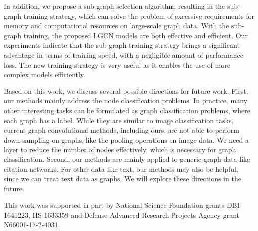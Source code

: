 \documentclass[sigconf]{acmart}
\begin{document}
In addition, we propose a sub-graph selection algorithm, resulting
in the sub-graph training strategy, which can solve the problem of
excessive requirements for memory and computational resources on
large-scale graph data. With the sub-graph training, the proposed
LGCN models are both effective and efficient. Our experiments
indicate that the sub-graph training strategy brings a significant
advantage in terms of training speed, with a negligible amount of
performance loss. The new training strategy is very useful as it
enables the use of more complex models efficiently.


Based on this work, we discuss several possible directions for
future work. First, our methods mainly address the node
classification problems. In practice, many other interesting tasks
can be formulated as graph classification problems, where each graph
has a label. While they are similar to image classification tasks,
current graph convolutional methods, including ours, are not able to
perform down-sampling on graphs, like the pooling operations on
image data. We need a layer to reduce the number of nodes
effectively, which is necessary for graph classification. Second,
our methods are mainly applied to generic graph data like citation
networks. For other data like text, our methods may also be helpful,
since we can treat text data as graphs. We will explore these
directions in the future.


\begin{acks}
This work was supported in part by National Science Foundation
grants DBI-1641223, IIS-1633359 and Defense Advanced Research
Projects Agency grant N66001-17-2-4031.
\end{acks}



\end{document}
